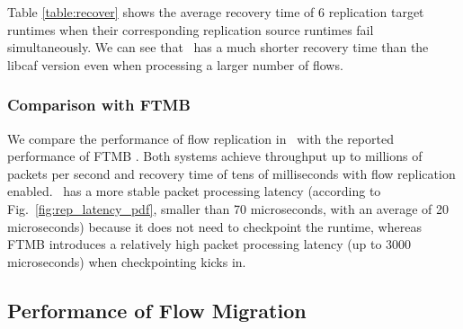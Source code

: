 Table \ref{table:recover} shows the average recovery time of 6 replication target runtimes when their corresponding replication source runtimes fail simultaneously. We can see that \nfactor~has a much shorter recovery time than the libcaf version even when processing a larger number of flows.

\vspace{-3mm}
\subsubsection{Comparison with FTMB} We compare the performance of flow replication in \nfactor~with the reported performance of FTMB \cite{sherry2015rollback}. Both systems achieve throughput up to millions of packets per second and recovery time of tens of milliseconds with flow replication enabled. \nfactor~has a more stable packet processing latency (according to Fig.~\ref{fig:rep_latency_pdf}, smaller than 70 microseconds, with an average of 20 microseconds) because it does not need to checkpoint the runtime, whereas FTMB introduces a relatively high packet processing latency (up to 3000 microseconds) when checkpointing kicks in.

\subsection{Performance of Flow Migration}
\label{sec:fmp}

